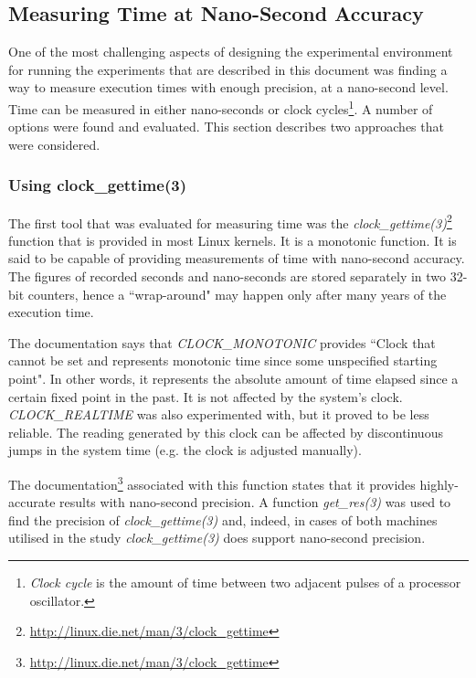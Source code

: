\subsection{Measuring Time at Nano-Second Accuracy}
\label{measuringTime}

One of the most challenging aspects of designing the experimental environment for running the experiments that are described in this document was finding a way to measure execution times with enough precision, at a nano-second level. Time can be measured in either nano-seconds or clock cycles\footnote{\textit{Clock cycle} is the amount of time between two adjacent pulses of a processor oscillator.}. A number of options were found and evaluated. This section describes two approaches that were considered.

\subsubsection{Using clock\_gettime(3)}

The first tool that was evaluated for measuring time was the \textit{clock\_gettime(3)}\footnote{\url{http://linux.die.net/man/3/clock_gettime}} function that is provided in most Linux kernels. It is a monotonic function. It is said to be capable of providing measurements of time with nano-second accuracy. The figures of recorded seconds and nano-seconds are stored separately in two 32-bit counters, hence a ``wrap-around" may happen only after many years of the execution time.

The documentation says that \textit{CLOCK\_MONOTONIC} provides ``Clock that cannot be set and represents monotonic time since some unspecified starting point". In other words, it represents the absolute amount of time elapsed since a certain fixed point in the past. It is not affected by the system's clock. \textit{CLOCK\_REALTIME} was also experimented with, but it proved to be less reliable. The reading generated by this clock can be affected by discontinuous jumps in the system time (e.g. the clock is adjusted manually).

The documentation\footnote{\url{http://linux.die.net/man/3/clock_gettime}} associated with this function states that it provides highly-accurate results with nano-second precision. A function \textit{get\_res(3)} was used to find the precision of \textit{clock\_gettime(3)} and, indeed, in cases of both machines utilised in the study \textit{clock\_gettime(3)} does support nano-second precision.


